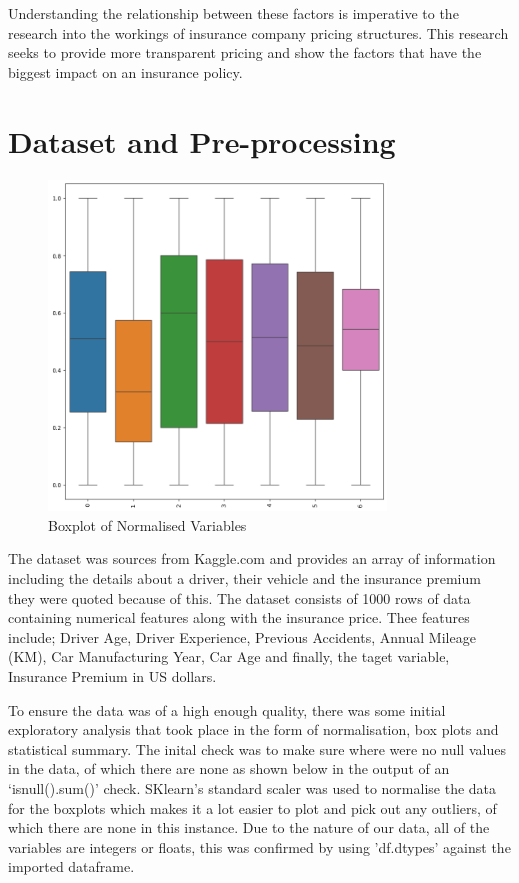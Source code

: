 \documentclass{article}
\begin{document}
Understanding the relationship between these factors is imperative to the research into the workings of insurance company pricing structures. This research seeks to provide more transparent pricing and show the factors that have the biggest impact on an insurance policy.

\newpage
\section{Dataset and Pre-processing}

\begin{figure}[h]
\centering
\includegraphics[width=0.8\textwidth]{boxplot.png}
\caption{Boxplot of Normalised Variables}\label{fig:boxplot}
\end{figure}

The dataset was sources from Kaggle.com and provides an array of information including the details about a driver, their vehicle and the insurance premium they were quoted because of this\cite{Sriram_2025}. The dataset consists of 1000 rows of data containing numerical features along with the insurance price. Thee features include; Driver Age, Driver Experience, Previous Accidents, Annual Mileage (KM), Car Manufacturing Year, Car Age and finally, the taget variable, Insurance Premium in US dollars.  

To ensure the data was of a high enough quality, there was some initial exploratory analysis that took place in the form of normalisation, box plots and statistical summary. The inital check was to make sure where were no null values in the data, of which there are none as shown below in the output of an `isnull().sum()' check. SKlearn's standard scaler \cite{scikit_scaler} was used to normalise the data for the boxplots which makes it a lot easier to plot and pick out any outliers, of which there are none in this instance. Due to the nature of our data, all of the variables are integers or floats, this was confirmed by using 'df.dtypes' against the imported dataframe.
\end{document}
